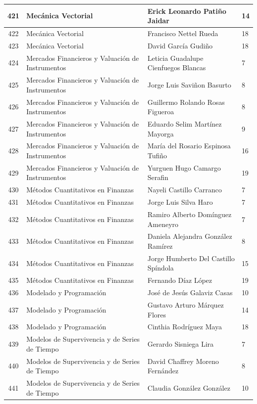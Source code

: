 {\begin{longtable}{|c|p{6.5cm}|p{5cm}|p{1.5cm}|}
421 & Mecánica Vectorial & Erick Leonardo Patiño Jaidar & 14 \\ \hline
422 & Mecánica Vectorial & Francisco Nettel Rueda & 18 \\ \hline
423 & Mecánica Vectorial & David García Gudiño & 18 \\ \hline
424 & Mercados Financieros y Valuación de Instrumentos & Leticia Guadalupe Cienfuegos Blancas & 7 \\ \hline
425 & Mercados Financieros y Valuación de Instrumentos & Jorge Luis Saviñon Basurto & 8 \\ \hline
426 & Mercados Financieros y Valuación de Instrumentos & Guillermo Rolando Rosas Figueroa & 8 \\ \hline
427 & Mercados Financieros y Valuación de Instrumentos & Eduardo Selim Martínez Mayorga & 9 \\ \hline
428 & Mercados Financieros y Valuación de Instrumentos & María del Rosario Espinosa Tufiño & 16 \\ \hline
429 & Mercados Financieros y Valuación de Instrumentos & Yurguen Hugo Camargo Serafin & 19 \\ \hline
430 & Métodos Cuantitativos en Finanzas & Nayeli Castillo Carranco & 7 \\ \hline
431 & Métodos Cuantitativos en Finanzas & Jorge Luis Silva Haro & 7 \\ \hline
432 & Métodos Cuantitativos en Finanzas & Ramiro Alberto Domínguez Ameneyro & 7 \\ \hline
433 & Métodos Cuantitativos en Finanzas & Daniela Alejandra González Ramírez & 8 \\ \hline
434 & Métodos Cuantitativos en Finanzas & Jorge Humberto Del Castillo Spíndola & 15 \\ \hline
435 & Métodos Cuantitativos en Finanzas & Fernando Díaz López & 19 \\ \hline
436 & Modelado y Programación & José de Jesús Galaviz Casas & 10 \\ \hline
437 & Modelado y Programación & Gustavo Arturo Márquez Flores & 14 \\ \hline
438 & Modelado y Programación & Cinthia Rodríguez Maya & 18 \\ \hline
439 & Modelos de Supervivencia y de Series de Tiempo & Gerardo Sisniega Lira & 7 \\ \hline
440 & Modelos de Supervivencia y de Series de Tiempo & David Chaffrey Moreno Fernández & 8 \\ \hline
441 & Modelos de Supervivencia y de Series de Tiempo & Claudia González González & 10 \\ \hline

\end{longtable}}
